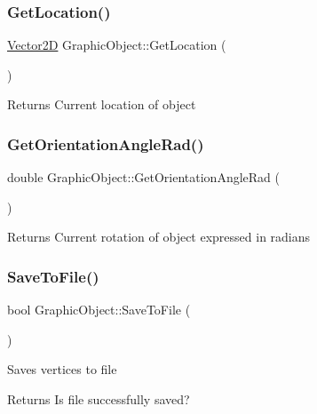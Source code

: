 \subsubsection{\texorpdfstring{Get\+Location()}{GetLocation()}}
{\footnotesize\ttfamily \hyperlink{Vector2D_8h_a2a0274942d24318d2654bd0f75c54fb7}{Vector2D} Graphic\+Object\+::\+Get\+Location (\begin{DoxyParamCaption}{ }\end{DoxyParamCaption})}

\begin{DoxyReturn}{Returns}
Current location of object 
\end{DoxyReturn}
\mbox{\label{classGraphicObject_a1f78c24074e454b60ed986a29722c1ff}} 
\subsubsection{\texorpdfstring{Get\+Orientation\+Angle\+Rad()}{GetOrientationAngleRad()}}
{\footnotesize\ttfamily double Graphic\+Object\+::\+Get\+Orientation\+Angle\+Rad (\begin{DoxyParamCaption}{ }\end{DoxyParamCaption})}

\begin{DoxyReturn}{Returns}
Current rotation of object expressed in radians 
\end{DoxyReturn}
\mbox{\label{classGraphicObject_a2c68d0e1ae71d0d866455fa39f3d60ce}} 
\subsubsection{\texorpdfstring{Save\+To\+File()}{SaveToFile()}}
{\footnotesize\ttfamily bool Graphic\+Object\+::\+Save\+To\+File (\begin{DoxyParamCaption}{ }\end{DoxyParamCaption})}

Saves vertices to file \begin{DoxyReturn}{Returns}
Is file successfully saved? 
\end{DoxyReturn}
\mbox{\label{classGraphicObject_a0dfb2d11fad4237edb8653fd6df609e9}} 
